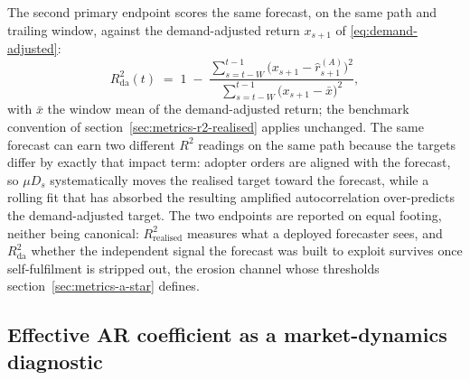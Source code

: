 \documentclass[12pt]{article}
\begin{document}
The second primary endpoint scores the same forecast, on the same path and trailing window, against the demand-adjusted return $x_{s+1}$ of \eqref{eq:demand-adjusted}:
\begin{equation}
  R^{2}_{\mathrm{da}}(t) \;=\; 1 \;-\; \frac{\sum_{s=t-W}^{t-1} \bigl(x_{s+1} - \hat{r}^{(A)}_{s+1}\bigr)^{2}}{\sum_{s=t-W}^{t-1} \bigl(x_{s+1} - \bar{x}\bigr)^{2}},
  \label{eq:r2-da}
\end{equation}
with $\bar{x}$ the window mean of the demand-adjusted return; the benchmark convention of section~\ref{sec:metrics-r2-realised} applies unchanged. %
The same forecast can earn two different $R^{2}$ readings on the same path because the targets differ by exactly that impact term: adopter orders are aligned with the forecast, so $\mu D_s$ systematically moves the realised target toward the forecast, while a rolling fit that has absorbed the resulting amplified autocorrelation over-predicts the demand-adjusted target. %
The two endpoints are reported on equal footing, neither being canonical: $R^{2}_{\mathrm{realised}}$ measures what a deployed forecaster sees, and $R^{2}_{\mathrm{da}}$ whether the independent signal the forecast was built to exploit survives once self-fulfilment is stripped out, the erosion channel whose thresholds section~\ref{sec:metrics-a-star} defines. %

\subsection{Effective AR coefficient as a market-dynamics diagnostic}\label{sec:metrics-phi}
\end{document}
